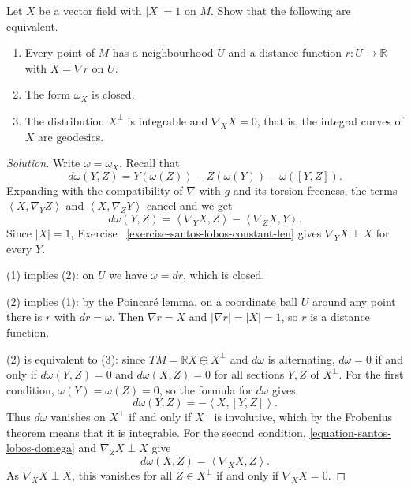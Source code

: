 \begin{exercise}
\label{exercise-santos-lobos-distance-fn}
Let $X$ be a vector field with $|X| = 1$ on
$M$. Show that the following are equivalent.
\begin{enumerate}
\item Every point of $M$ has a neighbourhood
$U$ and a distance function
$r : U \to \mathbb{R}$ with $X = \nabla r$
on $U$.
\item The form $\omega_X$ is closed.
\item The distribution $X^\perp$ is
integrable and $\nabla_X X = 0$, that is,
the integral curves of $X$ are geodesics.
\end{enumerate}
\end{exercise}

\begin{proof}[Solution]
Write $\omega = \omega_X$. Recall that
$$
d\omega(Y,Z) = Y(\omega(Z)) - Z(\omega(Y))
- \omega([Y,Z]).
$$
Expanding with the compatibility of
$\nabla$ with $g$ and its torsion freeness,
the terms
$\left\langle{} X, \nabla_Y Z
\right\rangle{}$ and
$\left\langle{} X, \nabla_Z Y
\right\rangle{}$ cancel and we get
\begin{equation}
\label{equation-santos-lobos-domega}
d\omega(Y,Z) =
\left\langle{} \nabla_Y X, Z \right\rangle{}
- \left\langle{} \nabla_Z X, Y
\right\rangle{}.
\end{equation}
Since $|X| = 1$, Exercise~%
\ref{exercise-santos-lobos-constant-len}
gives $\nabla_Y X \perp X$ for every $Y$.

(1) implies (2): on $U$ we have
$\omega = dr$, which is closed.

(2) implies (1): by the Poincaré lemma,
on a coordinate ball $U$ around any point
there is $r$ with $dr = \omega$. Then
$\nabla r = X$ and $|\nabla r| = |X| = 1$,
so $r$ is a distance function.

(2) is equivalent to (3): since
$TM = \mathbb{R}X \oplus X^\perp$ and
$d\omega$ is alternating, $d\omega = 0$ if
and only if $d\omega(Y,Z) = 0$ and
$d\omega(X,Z) = 0$ for all sections $Y, Z$
of $X^\perp$. For the first condition,
$\omega(Y) = \omega(Z) = 0$, so the formula
for $d\omega$ gives
$$
d\omega(Y,Z) = -\left\langle{} X, [Y,Z]
\right\rangle{}.
$$
Thus $d\omega$ vanishes on $X^\perp$ if and
only if $X^\perp$ is involutive, which by
the Frobenius theorem means that it is
integrable. For the second condition,
\eqref{equation-santos-lobos-domega} and
$\nabla_Z X \perp X$ give
$$
d\omega(X,Z) =
\left\langle{} \nabla_X X, Z \right\rangle{}.
$$
As $\nabla_X X \perp X$, this vanishes for
all $Z \in X^\perp$ if and only if
$\nabla_X X = 0$.
\end{proof}

